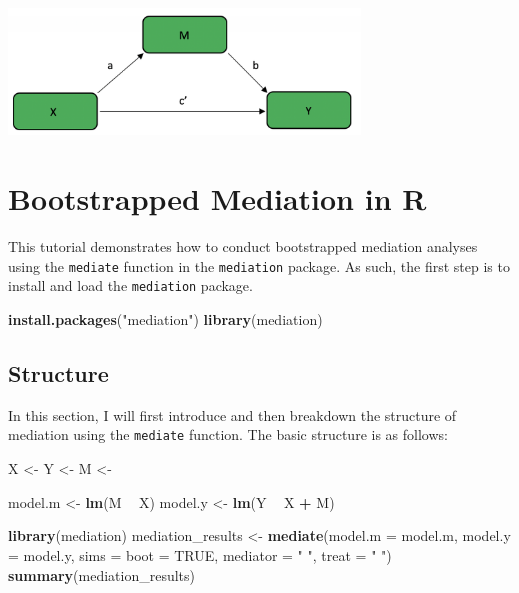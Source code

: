 \documentclass[]{book}
\newenvironment{Shaded}{\begin{snugshade}}{\end{snugshade}}
\newcommand{\DataTypeTok}[1]{\textcolor[rgb]{0.13,0.29,0.53}{#1}}
\newcommand{\KeywordTok}[1]{\textcolor[rgb]{0.13,0.29,0.53}{\textbf{#1}}}
\newcommand{\NormalTok}[1]{#1}
\newcommand{\OperatorTok}[1]{\textcolor[rgb]{0.81,0.36,0.00}{\textbf{#1}}}
\newcommand{\OtherTok}[1]{\textcolor[rgb]{0.56,0.35,0.01}{#1}}
\newcommand{\StringTok}[1]{\textcolor[rgb]{0.31,0.60,0.02}{#1}}
\begin{document}
\includegraphics[width=0.7\textwidth,height=\textheight]{images/mediation_indirect.png}

\hypertarget{bootstrapped-mediation-in-r}{%
\section{Bootstrapped Mediation in R}\label{bootstrapped-mediation-in-r}}

This tutorial demonstrates how to conduct bootstrapped mediation analyses using the \texttt{mediate} function in the \texttt{mediation} package. As such, the first step is to install and load the \texttt{mediation} package.

\begin{Shaded}
\begin{Highlighting}[]
\KeywordTok{install.packages}\NormalTok{(}\StringTok{"mediation"}\NormalTok{)}
\KeywordTok{library}\NormalTok{(mediation)}
\end{Highlighting}
\end{Shaded}

\hypertarget{structure}{%
\subsection{Structure}\label{structure}}

In this section, I will first introduce and then breakdown the structure of mediation using the \texttt{mediate} function. The basic structure is as follows:

\begin{Shaded}
\begin{Highlighting}[]
\NormalTok{X <-}
\NormalTok{Y <-}
\NormalTok{M <-}


\NormalTok{model.m <-}\StringTok{ }\KeywordTok{lm}\NormalTok{(M }\OperatorTok{~}\StringTok{ }\NormalTok{X)}
\NormalTok{model.y <-}\StringTok{ }\KeywordTok{lm}\NormalTok{(Y }\OperatorTok{~}\StringTok{ }\NormalTok{X }\OperatorTok{+}\StringTok{ }\NormalTok{M)}

\KeywordTok{library}\NormalTok{(mediation)}
\NormalTok{mediation_results <-}\StringTok{ }\KeywordTok{mediate}\NormalTok{(}\DataTypeTok{model.m =}\NormalTok{ model.m,}
                       \DataTypeTok{model.y =}\NormalTok{ model.y,}
                       \DataTypeTok{sims =} 
                       \DataTypeTok{boot =} \OtherTok{TRUE}\NormalTok{,}
                       \DataTypeTok{mediator =} \StringTok{"  "}\NormalTok{,}
                       \DataTypeTok{treat =} \StringTok{"  "}\NormalTok{)}
\KeywordTok{summary}\NormalTok{(mediation_results)}
\end{Highlighting}
\end{Shaded}
\end{document}
